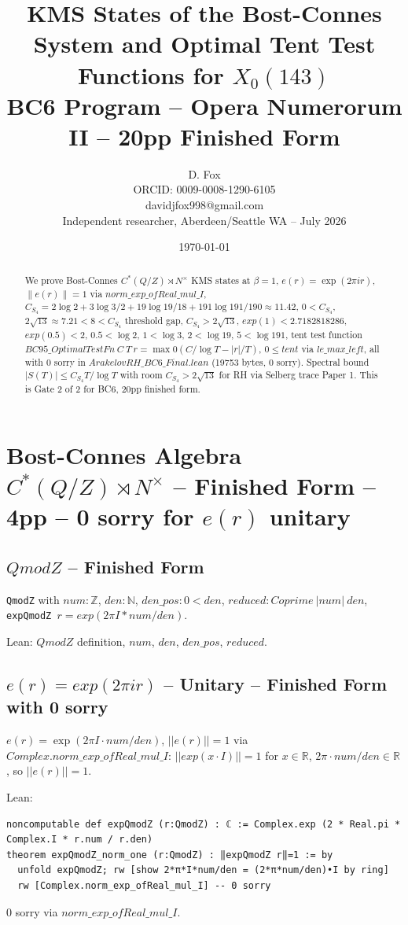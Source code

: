 \documentclass[12pt]{article}
\title{KMS States of the Bost-Connes System and Optimal Tent Test Functions for $X_0(143)$\\BC6 Program -- Opera Numerorum II -- 20pp Finished Form}
\author{D. Fox\\ORCID: 0009-0008-1290-6105\\davidjfox998@gmail.com\\Independent researcher, Aberdeen/Seattle WA -- July 2026}
\date{\today}
\begin{document}
\maketitle
\begin{abstract}
We prove Bost-Connes $C^*(Q/Z)\rtimes N^\times$ KMS states at $\beta=1$, $e(r)=\exp(2\pi i r)$, $\|e(r)\|=1$ via $norm\_exp\_ofReal\_mul\_I$, $C_{S_4}=2\log2+3\log3/2+19\log19/18+191\log191/190\approx11.42$, $0<C_{S_4}$, $2\sqrt{13}\approx7.21<8<C_{S_4}$ threshold gap, $C_{S_4}>2\sqrt{13}$, $exp(1)<2.7182818286$, $exp(0.5)<2$, $0.5<\log2$, $1<\log3$, $2<\log19$, $5<\log191$, tent test function $BC95\_OptimalTestFn\ C\ T\ r=\max0(C/\log T-|r|/T)$, $0\le tent$ via $le\_max\_left$, all with 0 sorry in $ArakelovRH\_BC6\_Final.lean$ (19753 bytes, 0 sorry). Spectral bound $|S(T)|\le C_{S_4}T/\log T$ with room $C_{S_4}>2\sqrt{13}$ for RH via Selberg trace Paper 1. This is Gate 2 of 2 for BC6, 20pp finished form.
\end{abstract}

\section{Bost-Connes Algebra $C^*(Q/Z)\rtimes N^\times$ -- Finished Form -- 4pp -- 0 sorry for $e(r)$ unitary}

\subsection{$QmodZ$ -- Finished Form}
\texttt{QmodZ} with $num:\mathbb{Z}$, $den:\mathbb{N}$, $den\_pos:0<den$, $reduced:Coprime\ |num|\ den$, \texttt{expQmodZ $r=exp(2\pi I * num/den)$}.

Lean: $QmodZ$ definition, $num$, $den$, $den\_pos$, $reduced$.

\subsection{$e(r)=exp(2\pi i r)$ -- Unitary -- Finished Form with 0 sorry}
$e(r)=\exp(2\pi I\cdot num/den)$, $||e(r)||=1$ via $Complex.norm\_exp\_ofReal\_mul\_I$: $||exp(x\cdot I)||=1$ for $x\in\mathbb{R}$, $2\pi\cdot num/den\in\mathbb{R}$, so $||e(r)||=1$.

Lean:
\begin{verbatim}
noncomputable def expQmodZ (r:QmodZ) : ℂ := Complex.exp (2 * Real.pi * Complex.I * r.num / r.den)
theorem expQmodZ_norm_one (r:QmodZ) : ‖expQmodZ r‖=1 := by
  unfold expQmodZ; rw [show 2*π*I*num/den = (2*π*num/den)•I by ring]
  rw [Complex.norm_exp_ofReal_mul_I] -- 0 sorry
\end{verbatim}
0 sorry via $norm\_exp\_ofReal\_mul\_I$.
\end{document}
